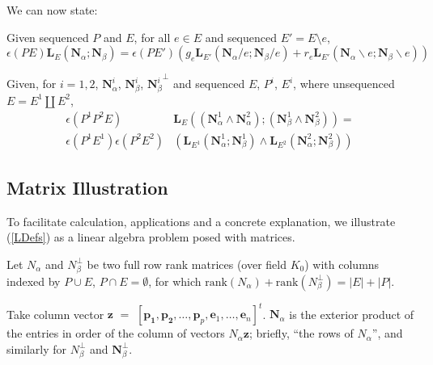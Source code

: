 \documentclass[Unicode]{cedram-alco}
\newcommand{\ext}[1]{\ensuremath{\mathbf{#1}}}
\newcommand{\Nal}{\ensuremath{N_{\alpha}}}
\newcommand{\NbePe}{\ensuremath{N_{\beta}^{\perp}}}
\newcommand{\eNal}{\ensuremath{\ext{N}_{\alpha}}}
\newcommand{\eNbe}{\ensuremath{\ext{N}_\beta}}
\newcommand{\dunion}{\coprod}
\newcommand{\extLHorSub}[3]{\ext{L}_{#1}\left(  {#2}; {#3}  \right)}
\newcommand{\LHorSub}[3]{\ext{L}_{#1}\left(  {#2}; {#3}  \right)}
\begin{document}
We can now state:



\begin{theo*}
  Given sequenced $P$ and $E$, for all $e\in E$ and sequenced $E'=E\setminus e$,
  \begin{equation}\label{delecontrequation-intro}
     \epsilon(PE)\extLHorSub{E}{\eNal}{\eNbe}=
      \epsilon(PE')
      \left(
      g_e\extLHorSub{E'}{\eNal/e}{\eNbe/e} +
      r_e\extLHorSub{E'}{\eNal\backslash e}{\eNbe\backslash e}\right)
  \end{equation}
\end{theo*}




\begin{theo*}
Given, for $i = 1, 2$,
  $\ext{N}_\alpha^{i}$,  $\ext{N}_\beta^{i}$, ${\ext{N}_\beta^{i}}^\perp$ 
  and
  sequenced $E$, $P^{i}$, $E^{i}$, where unsequenced $E=E^{1}\dunion E^{2}$,
  \begin{equation}\label{productequation-intro}
    \begin{split}
    \epsilon(P^1P^2E)
    &\LHorSub{E}
            {(\ext{N}_\alpha^{1}\wedge\ext{N}_\alpha^{2})}
            {(\ext{N}_\beta^{1}\wedge\ext{N}_\beta^{2})}
    = \\
    \epsilon(P^{1}E^{1})
    \epsilon(P^{2}E^{2}) 
        &\left(\LHorSub{E^{1}}{\ext{N}_\alpha^{1}}{\ext{N}_\beta^{1}}
        \wedge
        \LHorSub{E^{2}}{\ext{N}_\alpha^{2}}{\ext{N}_\beta^{2}}
          \right)
    \end{split}
  \end{equation}
\end{theo*}






\subsection{Matrix Illustration}
To facilitate calculation, applications and a concrete explanation,
we illustrate (\ref{LDefs}) as a linear algebra problem
posed with matrices.

Let $\Nal$ and $\NbePe$ be two full row rank matrices (over field $K_0$)
with columns indexed by $P\cup E$, $P\cap E=\emptyset$,
for which $\text{rank}(\Nal)+\text{rank}(\NbePe)=|E|+|P|$.

Take column vector $\ext{z}$
$=$ $[\ext{p_1},\ext{p_2},\ldots,\ext{p}_p,\ext{e}_1,\ldots,\ext{e}_n]^t$.
$\ext{N}_\alpha$ is the exterior product of the entries in order
of the column of vectors $\Nal \ext{z}$; briefly, ``the rows of $\Nal$'',
and similarly for $\NbePe$ and $\ext{N}_\beta^\perp$.
\end{document}
